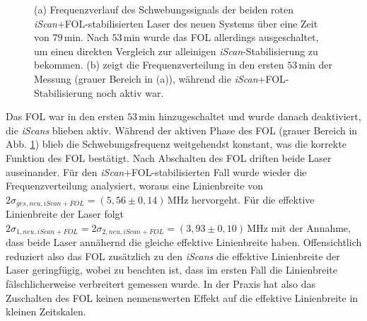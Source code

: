 \begin{figure}[hp]
 	\centering
 	\footnotesize
 	\fbox{\parbox{\dimexpr \linewidth - 2\fboxrule - 2\fboxsep}{
 	\subfloat[]{
		\label{subfig:beatfrequenzen_neu_iScan+FOL_drift}
		
		}\\
 	\subfloat[]{
		\label{subfig:beatfrequenzen_neu_iScan+FOL_histogramm}
		
		}
	}}
	\caption[Beatfrequenzen - neues System mit \textit{iScan}+FOL]{(a)
	Frequenzverlauf des Schwebungssignals der beiden roten
	\textit{iScan}+FOL-stabilisierten Laser des neuen Systems über eine Zeit von
	$79\,$min. Nach $53\,$min wurde das FOL allerdings ausgeschaltet, um
	einen direkten Vergleich zur alleinigen \textit{iScan}-Stabilisierung zu
	bekommen. (b) zeigt die Frequenzverteilung in den ersten $53\,$min der Messung
	(grauer Bereich in (a)), während die \textit{iScan}+FOL-Stabilisierung noch
	aktiv war.}
	\label{fig:beatfrequenzen_neu_iScan+FOL}
\end{figure}
Das FOL war in den ersten $53\,$min hinzugeschaltet und wurde danach
deaktiviert, die \textit{iScans} blieben aktiv. Während der aktiven Phase des
FOL (grauer Bereich in Abb.
\ref{fig:beatfrequenzen_neu_iScan+FOL})
blieb die Schwebungsfrequenz weitgehendst konstant, was die korrekte Funktion des FOL bestätigt. Nach
Abschalten des FOL driften beide Laser auseinander. Für den
\textit{iScan}+FOL-stabilisierten Fall wurde wieder die Frequenzverteilung
analysiert, woraus eine Linienbreite von
$2\sigma_{ges,neu,iScan+FOL}=(5,56\pm0,14)\,$MHz hervorgeht. Für die effektive
Linienbreite der Laser folgt
$2\sigma_{1,neu,iScan+FOL}=2\sigma_{2,neu,iScan+FOL}=(3,93\pm0,10)\,$MHz mit
der Annahme, dass beide Laser annähernd die gleiche effektive Linienbreite haben.
Offensichtlich reduziert also das FOL zusätzlich zu den \textit{iScans} die
effektive Linienbreite der Laser geringfügig, wobei zu beachten ist, dass im
ersten Fall die Linienbreite fälschlicherweise verbreitert gemessen wurde. In der
Praxis hat also das Zuschalten des FOL keinen nennenswerten Effekt auf die
effektive Linienbreite in kleinen Zeitskalen.


